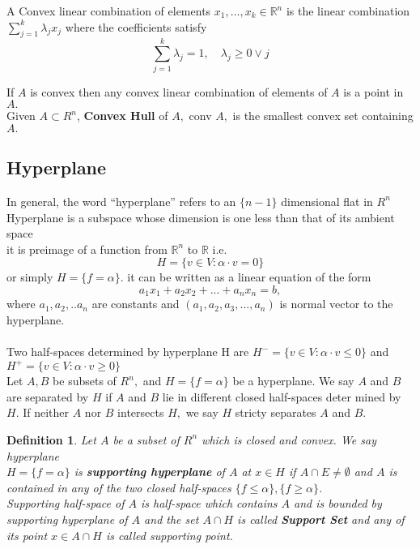 \documentclass[oneside]{book}
\newtheorem{mydef}{Definition}
\begin{document}
 A Convex linear combination of elements $x_{1}, \ldots, x_{k} \in \mathbb{R}^{n}$ is the
linear combination
$
\sum_{j=1}^{k} \lambda_{j} x_{j}
$
where the coefficients satisfy
$$
\sum_{j=1}^{k} \lambda_{j}=1, \quad \lambda_{j} \geq 0 \vee j
$$


If $A$ is convex then any convex linear combination of elements
of $A$ is a point in $A .$\\

 
 
 Given $A \subset R^{n}$, \textbf{Convex Hull} of $A,$ conv $A,$ is the smallest
convex set containing $A .$


 \subsection{Hyperplane} 
 \label{ss:4}
 In general, the word “hyperplane” refers to an $\{n-1\}$ dimensional flat in $R^{n}$ \\
 Hyperplane is a subspace whose dimension is one less than that of its ambient space  
 \\ it is preimage of a function from $\mathbb{R}^{n}$ to $\mathbb{R}$ i.e.
 \begin{equation}
 \label{eq16}  
   H=\{v \in V: \alpha \cdot v=0\} 
  \end{equation}  
    or simply  $H = \{f = \alpha \}$. 
   it can be written	as  a linear equation of the form
$$a_1x_1 + a_2x_2 + ... + a_nx_n = b,$$ where $a_1,a_2,..a_n$ are constants and $(a_1,a_2,a_3,...,a_n)$ is normal vector to the hyperplane.
\\\\
 Two half-spaces  determined by hyperplane H are 
$H^{-}=\{v \in V: \alpha \cdot v \leq 0\}$ and  $ H^{+}=\{v \in V: \alpha \cdot v \geq 0\} $ 
\\
Let $A, B$ be subsets of $R^{n},$ and $H=\{f=\alpha\}$ be a hyperplane. We say $A$ and
$B$ are separated by $H$ if $A$ and $B$ lie in different closed half-spaces deter
mined by $H .$ If neither $A$ nor $B$ intersects $H,$ we say $H$ stricty separates $A$
and $B .$\\

\begin{mydef}
Let $A$ be a subset of $R^{n}$ which is closed and convex. We say hyperplane \\ $H=\{f=\alpha\}$ is \textbf{supporting hyperplane} of $A$ at  $x \in H$  if $A \cap E \neq \emptyset$ and $A$ is contained in any of the two closed half-spaces $\{f \leq \alpha\}, \{f \geq \alpha\}$.
\\
    Supporting half-space of $A$ is half-space which contains $A$ and is bounded by supporting hyperplane of $A$  and the set $A \cap H$ is called \textbf{Support Set} and any of its point $x \in A \cap H$ is called supporting point.
\end{mydef}
\end{document}
